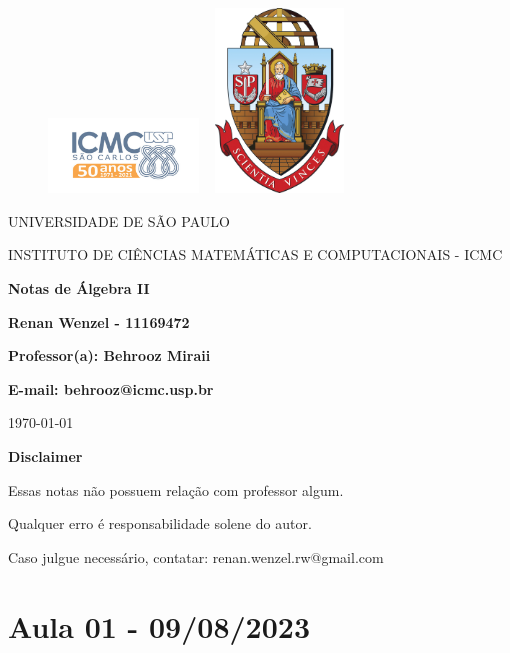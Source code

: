 \documentclass{article}
\begin{document}
\begin{figure}[ht]
\includegraphics[width=4cm]{icmc.png}
\hspace{7cm}
\includegraphics[height=4.9cm,width=4cm]{brasao_usp_cor.jpg}
\endminipage  
\end{figure}

\begin{center}
\vspace{1cm}
\LARGE
UNIVERSIDADE DE S\~AO PAULO

\vspace{1.3cm}
\LARGE
INSTITUTO DE CI\^ENCIAS MATEM\'ATICAS E COMPUTACIONAIS - ICMC

\vspace{1.7cm}
\Large
\textbf{Notas de Álgebra II}

\vspace{1.3cm}
\large
\textbf{Renan Wenzel - 11169472}

\vspace{1.3cm}
\large
\textbf{Professor(a): Behrooz Miraii}

\textbf{E-mail: behrooz@icmc.usp.br}

\vspace{1.3cm}
\today
\end{center}

\newpage
\textbf{{\Huge Disclaimer}}
\vspace{5cm}

{\huge Essas notas não possuem relação com professor algum. 

Qualquer erro é responsabilidade solene do autor.

Caso julgue necessário, contatar: renan.wenzel.rw@gmail.com}
\tableofcontents

\newpage

\section{Aula 01 - 09/08/2023}
\newpage
\end{document}
